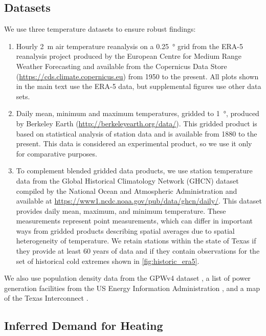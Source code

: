 \documentclass[12pt]{iopart}
\begin{document}
\subsection{Datasets}

We use three temperature datasets to ensure robust findings:
\begin{enumerate}
  \item Hourly \SI{2}{\meter} air temperature reanalysis on a \SI{0.25}{\degree} grid from the ERA-5 reanalysis project produced by the European Centre for Medium Range Weather Forecasting \cite{hersbach_era5:2020} and available  from the Copernicus Data Store (\url{https://cds.climate.copernicus.eu}) from 1950 to the present. All plots shown in the main text use the ERA-5 data, but supplemental figures use other data sets.
  \item Daily mean, minimum and maximum temperatures, gridded to \SI{1}{\degree}, produced by Berkeley Earth (\url{http://berkeleyearth.org/data/}). This gridded product is based on statistical analysis of station data and is available from 1880 to the present. This data is considered an experimental product, so we use it only for comparative purposes.
  \item To complement blended gridded data products, we use station temperature data from the Global Historical Climatology Network (GHCN) dataset compiled by the National Ocean and Atmospheric Administration \cite{Menne:2012hk} and available at \url{https://www1.ncdc.noaa.gov/pub/data/ghcn/daily/}. This dataset provides daily mean, maximum, and minimum temperature. These measurements represent point measurements, which can differ in important ways from gridded products describing spatial averages due to spatial heterogeneity of temperature. We retain stations within the state of Texas if they provide at least 60 years of data and if they contain observations for the set of historical cold extremes shown in \cref{fig:historic_era5}.
\end{enumerate}
We also use population density data from the GPWv4 dataset \cite{ciesin_gpwv4:2016}, a list of power generation facilities from the US Energy Information Administration \cite{useia_generators:2021}, and a map of the Texas Interconnect \cite{useia_regions:2021}.


\subsection{Inferred Demand for Heating}\label{sec:inferred-demand}
\end{document}
